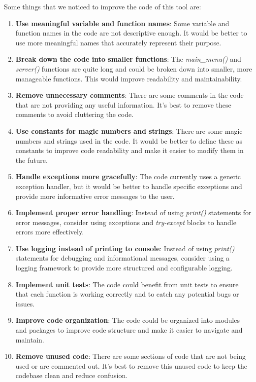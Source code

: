 \documentclass[openany]{report}
\begin{document}
Some things that we noticed to improve the code of this tool are:
\begin{enumerate}
    \item \textbf{Use meaningful variable and function names}: Some variable and function names in the code are not descriptive enough. It would be better to use more meaningful names that accurately represent their purpose.

    \item \textbf{Break down the code into smaller functions}: The \textit{main\_menu()} and \textit{server()} functions are quite long and could be broken down into smaller, more manageable functions. This would improve readability and maintainability.

    \item \textbf{Remove unnecessary comments}: There are some comments in the code that are not providing any useful information. It's best to remove these comments to avoid cluttering the code.

    \item \textbf{Use constants for magic numbers and strings}: There are some magic numbers and strings used in the code. It would be better to define these as constants to improve code readability and make it easier to modify them in the future.

    \item \textbf{Handle exceptions more gracefully}: The code currently uses a generic exception handler, but it would be better to handle specific exceptions and provide more informative error messages to the user.

    \item \textbf{Implement proper error handling}: Instead of using \textit{print()} statements for error messages, consider using exceptions and \textit{try-except} blocks to handle errors more effectively.

    \item \textbf{Use logging instead of printing to console}: Instead of using \textit{print()} statements for debugging and informational messages, consider using a logging framework to provide more structured and configurable logging.

    \item \textbf{Implement unit tests}: The code could benefit from unit tests to ensure that each function is working correctly and to catch any potential bugs or issues.

    \item \textbf{Improve code organization}: The code could be organized into modules and packages to improve code structure and make it easier to navigate and maintain.

    \item \textbf{Remove unused code}: There are some sections of code that are not being used or are commented out. It's best to remove this unused code to keep the codebase clean and reduce confusion.
\end{enumerate}
\end{document}
